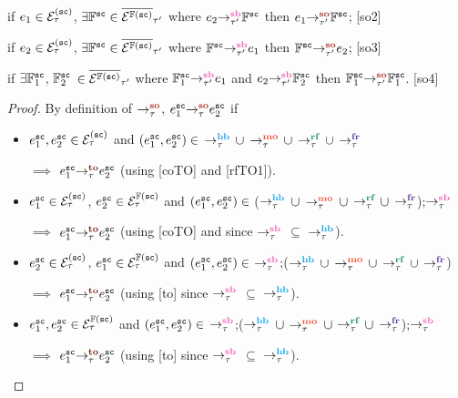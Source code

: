 	if
	$e_1 \in \ordevents{\sc}_\tau$, 
	$\exists \mathbb{F}^\sc \in \ordsfences{\sc}_{\tau'}$ where
	$\seqb{\tau'}{e_2}{\mathbb{F}^\sc}$ then
	$\so{\tau'}{e_1}{\mathbb{F}^\sc}$;
	\hfill[so2]
	
	if
	$e_2 \in \ordevents{\sc}_\tau$, 
	$\exists \mathbb{F}^\sc \in \ordsfences{\sc}_{\tau'}$ where
	$\seqb{\tau'}{\mathbb{F}^\sc}{e_1}$ then
	$\so{\tau'}{\mathbb{F}^\sc}{e_2}$;
	\hfill[so3]
	
	if
	$\exists \mathbb{F}^\sc_1$, $\mathbb{F}^\sc_2$ 
	$\in \ordsfences{\sc}_{\tau'}$ where
	$\seqb{\tau'}{\mathbb{F}^\sc_1}{e_1}$ and 
	$\seqb{\tau'}{e_2}{\mathbb{F}^\sc_2}$ then
	$\so{\tau'}{\mathbb{F}^\sc_1}{\mathbb{F}^\sc_1}$.
	\hfill[so4]


{
	\label{lem:so subset to}}
\begin{proof}
		By definition of $\setSO$, $\so{\tau}{e^\sc_1}{e^\sc_2}$ if
		\begin{itemize}[label=so4,align=left,leftmargin=*]
			\item [so1:] $e^\sc_1, e^\sc_2 \in \ordevents{\sc}_\tau$
				and $(e^\sc_1, e^\sc_2) \in$ $\setHB$ $\union$ 
				$\setMO$ $\union$ $\setRF$ $\union$ $\setFR$
				
				$\implies$ $\to{\tau}{e^\sc_1}{e^\sc_2}$
				(using [coTO] and [rfTO1]).
				
			\item [so2:] $e^\sc_1 \in \ordevents{\sc}_\tau$,
				$e^\sc_2 \in \ordfences{\sc}_\tau$
				and $(e^\sc_1, e^\sc_2) \in$ ($\setHB$ $\union$ 
				$\setMO$ $\union$ $\setRF$ $\union$ $\setFR$);$\setSB$
			
				$\implies$ $\to{\tau}{e^\sc_1}{e^\sc_2}$
				(using [coTO] and  
				since $\setSB$ $\subseteq$ $\setHB$).
				
			\item [so3:] $e^\sc_2 \in \ordevents{\sc}_\tau$,
				$e^\sc_1 \in \ordfences{\sc}_\tau$
				and $(e^\sc_1, e^\sc_2) \in$ $\setSB$;($\setHB$ 
				$\union$ $\setMO$ $\union$ $\setRF$ $\union$ $\setFR$)
			
				$\implies$ $\to{\tau}{e^\sc_1}{e^\sc_2}$
				(using [to] since $\setSB$ $\subseteq$ $\setHB$).
				
			\item [so2:] $e^\sc_1, e^\sc_2 \in \ordfences{\sc}_\tau$
				and $(e^\sc_1, e^\sc_2) \in$ $\setSB$;($\setHB$ $\union$ 
				$\setMO$ $\union$ $\setRF$ $\union$ $\setFR$);$\setSB$
			
				$\implies$ $\to{\tau}{e^\sc_1}{e^\sc_2}$
				(using [to] since $\setSB$ $\subseteq$ $\setHB$).
		\end{itemize}
\end{proof}


